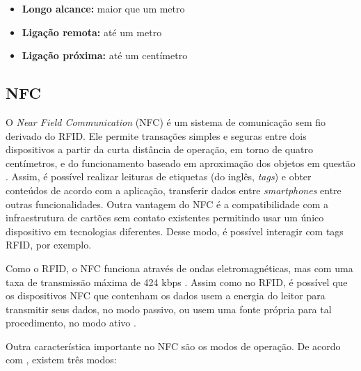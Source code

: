 \begin{itemize} \parskip -3pt
	\item \textbf{Longo alcance:} maior que um metro
	\item \textbf{Ligação remota:} até um metro
	\item \textbf{Ligação próxima:} até um centímetro
\end{itemize}


\subsection{NFC}

O \textit{\textit{Near Field Communication}} (NFC) é um sistema de comunicação sem fio derivado do RFID. Ele permite transações simples e seguras entre dois dispositivos a partir da curta distância de operação, em torno de quatro centímetros, e do funcionamento baseado em aproximação dos objetos em questão \cite{NFCForum2016}. 
Assim, é possível realizar leituras de etiquetas (do inglês, \textit{tags}) e obter conteúdos de acordo com a aplicação, transferir dados entre \textit{smartphones} entre outras funcionalidades.
Outra vantagem do NFC é a compatibilidade com a infraestrutura de cartões sem contato existentes permitindo usar um único dispositivo em tecnologias diferentes. Desse modo, é possível interagir com tags RFID, por exemplo.


Como o RFID, o NFC funciona através de ondas eletromagnéticas, mas com uma taxa de transmissão máxima de 424 kbps \cite{NFCForum2016}. Assim como no RFID, é possível que os dispositivos NFC que contenham os dados usem a energia do leitor para transmitir seus dados, no modo passivo, ou usem uma fonte própria para tal procedimento, no modo ativo \cite{Igoe2014}.


Outra característica importante no NFC são os modos de operação. De acordo com , existem três modos:

